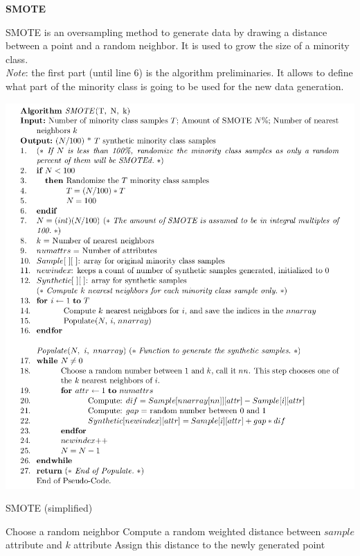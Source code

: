 {\fontsize{12pt}{22pt} \textbf{SMOTE}\par}

\vspace{5mm}

SMOTE is an oversampling method to generate data by drawing a distance between a point and a random neighbor. It is used to grow the size of a minority class. \\

\textit{Note}: the first part (until line 6) is the algorithm preliminaries. It allows to define what part of the minority class is going to be used for the new data generation.

\includegraphics[scale=0.4]{SMOTE_algo.png}

\begin{algorithm}
\caption{SMOTE (simplified)}
\begin{algorithmic}
\State Choose a random neighbor 
\State Compute a random weighted distance between $sample$ attribute and $k$ attribute
\State Assign this distance to the newly generated point
\EndFor
\EndFor
\end{algorithmic}
\end{algorithm}

